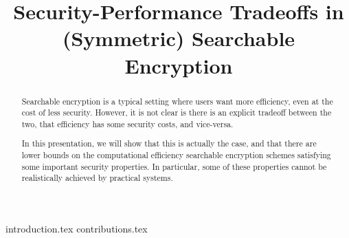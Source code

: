 \documentclass[letterpaper,twocolumn,10pt]{article}
\begin{document}
	
	\title{Security-Performance Tradeoffs in (Symmetric) Searchable Encryption}
	
	\iftoggle{anon}{
		\author{
		\alignauthor
		Anonymous submission
		}
	}{
	\author{\underline{Raphael Bost}\thanks{(Speaker) Direction Générale de l'Armement - Maîtrise de l'Information \& Université de Rennes 1, France. The views and conclusions contained herein are those of the author and should not be interpreted as necessarily representing the official policies or endorsements, either expressed or implied, of the DGA or the French Government.
	email: \href{mailto:raphael_bost@alumni.brown.edu}{\nolinkurl{raphael_bost@alumni.brown.edu}}
	}
	\and
	Pierre-Alain Fouque\thanks{Université de Rennes 1.
	email: \href{mailto:pierre-alain.fouque@ens.fr}{\nolinkurl{pierre-alain.fouque@ens.fr}}}
	\and 
	David Pointcheval\thanks{Ecole Normale Supérieure.
	email: \href{mailto:david.pointcheval@ens.fr}{\nolinkurl{david.pointcheval@ens.fr}}}
	}
	
	}	
	
	\date{}
	
	\maketitle 
	
	\begin{abstract}
		Searchable encryption is a typical setting where users want more efficiency, even at the cost of less security. 
		However, it is not clear is there is an explicit tradeoff between the two, \ie that efficiency has some security costs, and vice-versa.
		
		In this presentation, we will show that this is actually the case, and that there are lower bounds on the computational efficiency searchable encryption schemes satisfying some important security properties.
		In particular, some of these properties cannot be realistically achieved by practical systems.
	\end{abstract}
	
	{introduction.tex}
	{contributions.tex}
	
	
	
	
\end{document}
